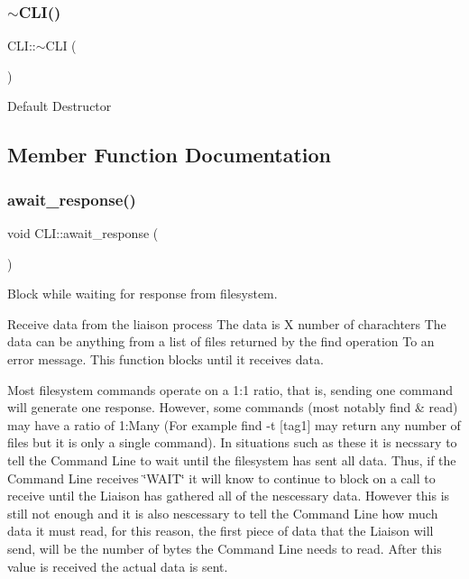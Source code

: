 \subsubsection{\texorpdfstring{$\sim$\+C\+L\+I()}{~CLI()}}
{\footnotesize\ttfamily C\+L\+I\+::$\sim$\+C\+LI (\begin{DoxyParamCaption}{ }\end{DoxyParamCaption})}

Default Destructor 

\subsection{Member Function Documentation}
\mbox{\label{classCLI_a87c68e5edcb5750d1199839e6b1f843e}} 
\subsubsection{\texorpdfstring{await\+\_\+response()}{await\_response()}}
{\footnotesize\ttfamily void C\+L\+I\+::await\+\_\+response (\begin{DoxyParamCaption}{ }\end{DoxyParamCaption})}



Block while waiting for response from filesystem. 

Receive data from the liaison process The data is X number of charachters The data can be anything from a list of files returned by the \textquotesingle{}find\textquotesingle{} operation To an error message. This function blocks until it receives data.

Most filesystem commands operate on a 1\+:1 ratio, that is, sending one command will generate one response. However, some commands (most notably \textquotesingle{}find\textquotesingle{} \& \textquotesingle{}read\textquotesingle{}) may have a ratio of 1\+:Many (For example \textquotesingle{}find -\/t \mbox{[}tag1\mbox{]}\textquotesingle{} may return any number of files but it is only a single command). In situations such as these it is necssary to tell the Command Line to wait until the filesystem has sent all data. Thus, if the Command Line receives \char`\"{}\+W\+A\+I\+T\char`\"{} it will know to continue to block on a call to receive until the Liaison has gathered all of the nescessary data. However this is still not enough and it is also nescessary to tell the Command Line how much data it must read, for this reason, the first piece of data that the Liaison will send, will be the number of bytes the Command Line needs to read. After this value is received the actual data is sent. \mbox{\label{classCLI_a6c3f97b04646b070ad82801adf0dc521}} 

